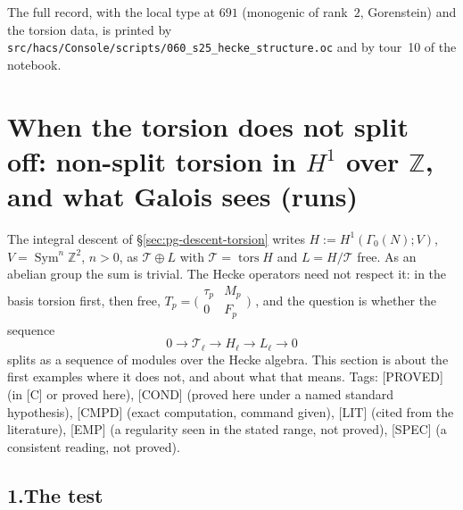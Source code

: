 \documentclass[11pt]{article}
\newcommand{\Z}{\mathbb{Z}}
\newcommand{\Sym}{\operatorname{Sym}}
\newcommand{\Ga}{\Gamma}
\newcommand{\file}[1]{\texttt{#1}}
\newcommand{\PROVED}{\textsf{\small[PROVED]}}
\newcommand{\LIT}{\textsf{\small[LIT]}}
\newcommand{\CMPD}{\textsf{\small[CMPD]}}
\newcommand{\EMP}{\textsf{\small[EMP]}}
\newcommand{\PGCOND}{\textsf{\small[COND]}}
\newcommand{\PGSPEC}{\textsf{\small[SPEC]}}
\newcommand{\smat}[4]{\bigl(\begin{smallmatrix}#1&#2\\#3&#4\end{smallmatrix}\bigr)}
\begin{document}
\noindent The full record, with the local type at $691$ (monogenic of rank~$2$, Gorenstein) and the torsion data, is printed by \file{src/hacs/Console/scripts/060\_s25\_hecke\_structure.oc} and by tour~10 of the notebook.

\section{When the torsion does not split off: non-split torsion in \texorpdfstring{$H^{1}$}{H1} over \texorpdfstring{$\Z$}{Z}, and what Galois sees (runs)}\label{sec:pg-nonsplit}

The integral descent of \S\ref{sec:pg-descent-torsion} writes $H:=H^{1}(\Ga_0(N);V)$, $V=\Sym^{n}\Z^{2}$, $n>0$, as $\mathcal T\oplus L$ with $\mathcal T=\operatorname{tors}H$ and $L=H/\mathcal T$
free. As an abelian group the sum is trivial. The Hecke operators need not respect it: in the basis torsion first, then free,
$T_p=\smat{\tau_p}{M_p}{0}{F_p}$ {}, and the question is whether the sequence
\[
  0\to\mathcal T_\ell\to H_\ell\to L_\ell\to0\tag{$\varepsilon$}
\]
splits as a sequence of modules over the Hecke algebra. This section is about the first examples where it does not, and about what that means. Tags: \PROVED{} (in [C] or proved here), \PGCOND{} (proved here under a named standard hypothesis), \CMPD{} (exact computation, command given), \LIT{} (cited from the literature), \EMP{} (a regularity seen in the stated range, not proved), \PGSPEC{} (a consistent reading, not proved).

\subsection*{1.\quad The test}
\end{document}
